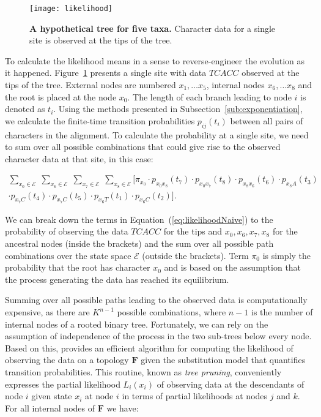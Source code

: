 \begin{figure}[h!]
\centering
\texttt{[image: likelihood]} 
\caption{
{ \footnotesize 
{\bf  A hypothetical tree for five taxa.} Character data for a single site is observed at the tips of the tree.
} %
}
\label{fig:LIKELIHOOD}
\end{figure}

To calculate the likelihood means in a sense to reverse-engineer the evolution as it happened.
Figure~\ref{fig:LIKELIHOOD} presents a single site with data $TCACC$ observed at the tips of the tree.
External nodes are numbered $x_{1}, \ldots x_{5}$, internal nodes $x_{6}, \ldots x_{8}$ and the root is placed at the node $x_{0}$.
The length of each branch leading to node $i$ is denoted as $t_{i}$. 
Using the methods presented in Subsection~\ref{sub:exponentiation}, we calculate the finite-time transition probabilities $p_{ij}(t_{i})$ between all pairs of characters in the alignment.
To calculate the probability at a single site, we need to sum over all possible combinations that could give rise to the observed character data at that site, in this case:

\begin{align}
\underset{x_{0}\in \mathcal{E}}{\sum}\;\underset{x_{6}\in \mathcal{E}}{\sum}\;\underset{x_{7}\in \mathcal{E}}{\sum}\;\underset{x_{8}\in \mathcal{E}}{\sum}[\pi_{x_{0}}\cdot p_{x_{0}x_{8}}(t_{7})\cdot p_{x_{0}x_{7}}(t_{8})\cdot p_{x_{8}x_{6}}(t_{6})\cdot p_{x_{8}A}(t_{3}) \nonumber \\
\cdot p_{x_{7}C}(t_{4})\cdot p_{x_{7}C}(t_{5})\cdot p_{x_{6}T}(t_{1})\cdot p_{x_{6}C}(t_{2})].
\label{eq:likelihoodNaive}
\end{align}

We can break down the terms in Equation~(\ref{eq:likelihoodNaive}) 
to the probability of observing the data $TCACC$ for the tips and $x_{0},x_{6},x_{7},x_{8}$ for the ancestral nodes (inside the brackets) and the sum over all possible path combinations over the state space $\mathcal{E}$ (outside the brackets).
Term $\pi_{0}$ is simply the probability that the root has character $x_{0}$ and is based on the assumption that the process generating the data has reached its equilibrium.

Summing over all possible paths leading to the observed data is computationally expensive, as there are  $K^{n-1}$ possible combinations, where $n-1$ is the number of internal nodes of a rooted binary tree.
Fortunately, we can rely on the assumption of independence of the process in the two sub-trees below every node.
Based on this, \citet{Felsenstein1981} provides an efficient algorithm for computing the likelihood of observing the data on a topology $\mathbf{F}$ given the substitution model that quantifies transition probabilities.
This routine, known as \emph{tree pruning}, conveniently expresses the partial likelihood $L_{i}(x_{i})$ of observing data at the descendants of node $i$ given state $x_{i}$ at node $i$ in terms of partial likelihoods at nodes $j$ and $k$.
For all internal nodes of $\mathbf{F}$ we have:

